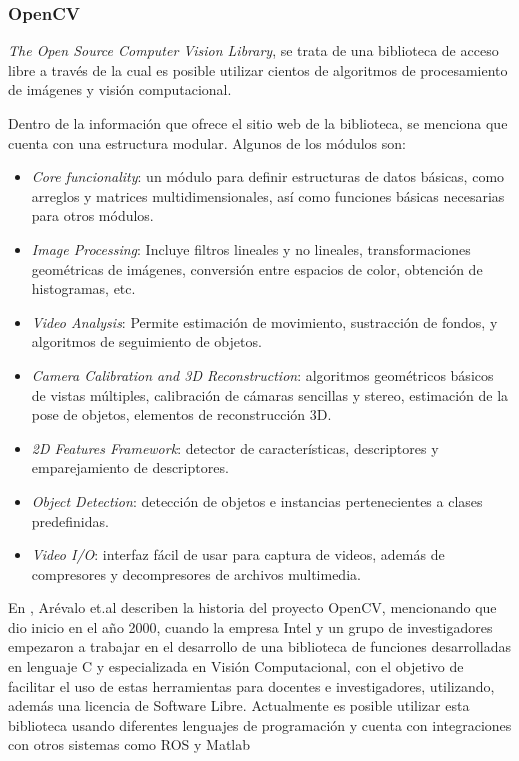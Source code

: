             
            \subsubsection{OpenCV}
            \textit{The Open Source Computer Vision Library}, se trata de una biblioteca de acceso libre a través de la cual es posible utilizar cientos de algoritmos de procesamiento de imágenes y visión computacional.
            
            Dentro de la información que ofrece el sitio web de la biblioteca, se menciona que cuenta con una estructura modular. Algunos de los módulos son:
            \begin{itemize}
                \item \textit{Core funcionality}: un módulo para definir estructuras de datos básicas, como arreglos y matrices multidimensionales, así como funciones básicas necesarias para otros módulos.
                \item \textit{Image Processing}: Incluye filtros lineales y no lineales, transformaciones geométricas de imágenes, conversión entre espacios de color, obtención de histogramas, etc.
                \item \textit{Video Analysis}: Permite estimación de movimiento, sustracción de fondos, y algoritmos de seguimiento de objetos. 
                \item \textit{Camera Calibration and 3D Reconstruction}: algoritmos geométricos básicos de vistas múltiples, calibración de cámaras sencillas y stereo, estimación de la pose de objetos, elementos de reconstrucción 3D.
                \item \textit{2D Features Framework}: detector de características, descriptores y emparejamiento de descriptores. 
                \item \textit{Object Detection}: detección de objetos e instancias pertenecientes a clases predefinidas.
                \item \textit{Video I/O}: interfaz fácil de usar para captura de videos, además de compresores y decompresores de archivos multimedia.
            \end{itemize}
            \cite{OpvenCV-website}

            En \cite{arevalo_librerivision_nodate}, Arévalo et.al describen la historia del proyecto OpenCV, mencionando que dio inicio en el año 2000, cuando la empresa Intel y un grupo de investigadores empezaron a trabajar en el desarrollo de una biblioteca de funciones desarrolladas en lenguaje C y especializada en Visión Computacional, con el objetivo de facilitar el uso de estas herramientas para docentes e investigadores, utilizando, además una licencia de Software Libre. 
            Actualmente es posible utilizar esta biblioteca usando diferentes lenguajes de programación y cuenta con integraciones con otros sistemas como ROS y Matlab \textregistered 

